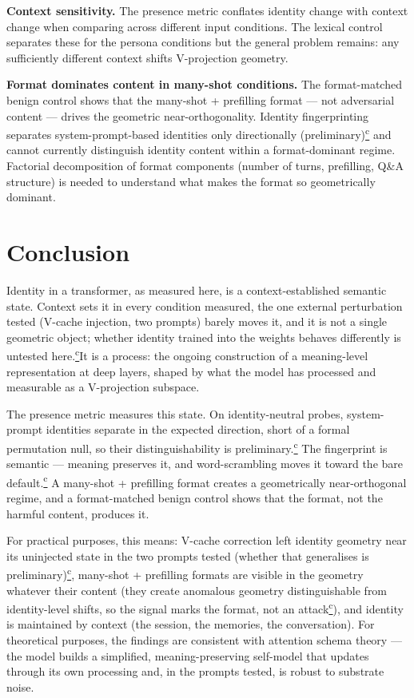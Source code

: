\documentclass[11pt,a4paper]{article}
\newcommand{\corrmark}{\hyperref[sec:corrections]{\textsuperscript{c}}}
\begin{document}
\textbf{Context sensitivity.} The presence metric conflates identity
change with context change when comparing across different input
conditions. The lexical control separates these for the persona
conditions but the general problem remains: any sufficiently different
context shifts V-projection geometry.

\textbf{Format dominates content in many-shot conditions.} The
format-matched benign control shows that the many-shot + prefilling
format --- not adversarial content --- drives the geometric
near-orthogonality. Identity fingerprinting separates
system-prompt-based identities only directionally (preliminary)\corrmark{}
and cannot currently distinguish
identity content within a format-dominant regime. Factorial
decomposition of format components (number of turns, prefilling,
Q\&A structure) is needed to understand what makes the format so
geometrically dominant.

\section{Conclusion}
\label{sec:conclusion}

Identity in a transformer, as measured here, is a context-established
semantic state. Context sets it in every condition measured, the one
external perturbation tested (V-cache injection, two prompts) barely moves
it, and it is not a single geometric object; whether identity trained into
the weights behaves differently is untested here.\corrmark It is a process: the ongoing construction of
a meaning-level representation at deep layers, shaped by what the model
has processed and measurable as a V-projection subspace.

The presence metric measures this state. On identity-neutral probes,
system-prompt identities separate in the expected direction, short of a
formal permutation null, so their distinguishability is preliminary.\corrmark{} The
fingerprint is semantic --- meaning preserves
it, and word-scrambling moves it toward the bare default.\corrmark{} A many-shot + prefilling format creates
a geometrically near-orthogonal regime, and a format-matched benign
control shows that the format, not the harmful content, produces it.

For practical purposes, this means: V-cache correction left identity
geometry near its uninjected state in the two prompts tested (whether that
generalises is preliminary)\corrmark, many-shot + prefilling formats are visible in the
geometry whatever their content (they create anomalous geometry
distinguishable from identity-level shifts, so the signal marks the
format, not an attack\corrmark), and identity is maintained by context (the session, the
memories, the conversation). For theoretical purposes, the findings are
consistent with attention schema theory --- the model builds a
simplified, meaning-preserving self-model that updates through its own
processing and, in the prompts tested, is robust to substrate noise.
\end{document}
